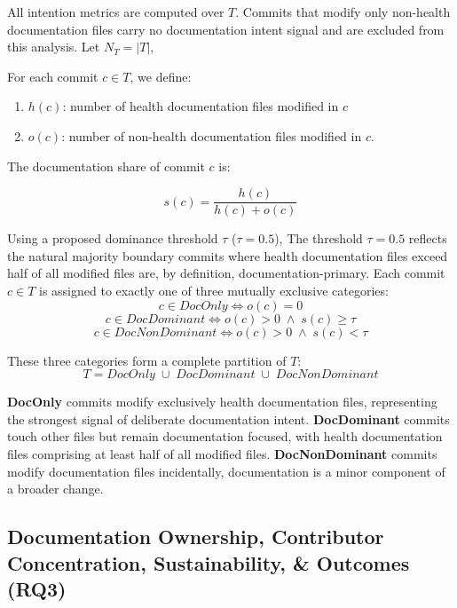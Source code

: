 \documentclass[10pt,conference]{IEEEtran}
\begin{document}
{All intention metrics are computed over $T$. Commits that modify only non-health documentation files carry no documentation intent signal and are excluded from this analysis. Let $N_T = |T|$,

For each commit $c \in T$, we define:

\begin{enumerate}[label=\roman*.]
  \item $h(c)$: number of health documentation files 
        modified in $c$
  \item $o(c)$: number of non-health documentation 
        files modified in $c$. 
\end{enumerate}

The documentation share of commit $c$ is:

\[
  s(c) = \frac{h(c)}{h(c) + o(c)}
\]

Using a proposed dominance threshold $\tau$ ($\tau = 
0.5$), The threshold $\tau = 0.5$ reflects the natural majority boundary commits where health documentation files exceed half of all modified files are, by definition, documentation-primary. 
Each commit $c \in T$ is assigned to exactly one of three mutually exclusive categories:
\vspace{-10pt}
\[
  c \in \textit{DocOnly} \iff o(c) = 0
\]
\vspace{-10pt}
\[
  c \in \textit{DocDominant} \iff 
  o(c) > 0 \;\wedge\; s(c) \geq \tau
\]
\vspace{-10pt}
\[
  c \in \textit{DocNonDominant} \iff 
  o(c) > 0 \;\wedge\; s(c) < \tau
\]

These three categories form a complete partition of 
$T$:
\vspace{-8pt}
\[
  T = \textit{DocOnly} \;\cup\; 
      \textit{DocDominant} \;\cup\; 
      \textit{DocNonDominant}
\]




\textbf{DocOnly} commits modify exclusively health documentation files, representing the strongest signal of deliberate documentation intent. \textbf{DocDominant} commits touch other files but remain documentation focused, with health documentation files comprising at least half of all modified files.  \textbf{DocNonDominant}
commits modify documentation files incidentally, documentation is a minor component of a broader change.

\subsection{Documentation Ownership, Contributor Concentration, Sustainability, \& Outcomes (RQ3) }
\label{sec:RQ3}

}
\end{document}
